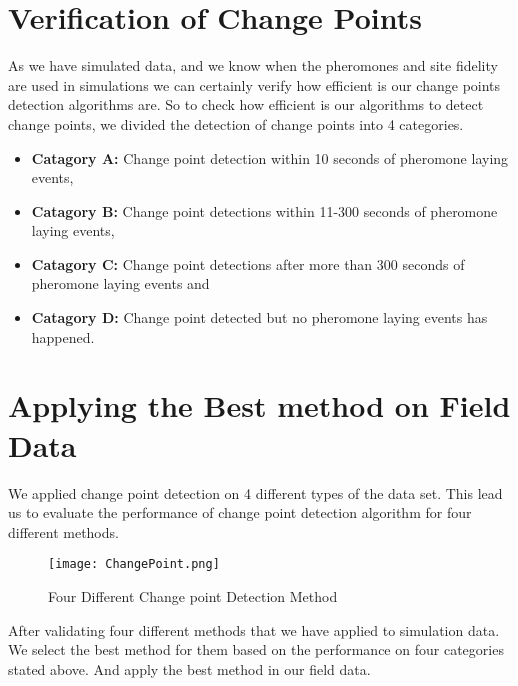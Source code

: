 \section{\label{section:Verification of Change Points}Verification of Change Points}
As we have simulated data, and we know when the pheromones and site fidelity are used in simulations we can certainly verify how efficient is our change points detection algorithms are. So to check how efficient is our algorithms to detect change points, we divided the detection of change points into 4 categories.
\begin{itemize}
	\item \textbf{Catagory A:} Change point detection within 10 seconds of pheromone laying events, 
	\item \textbf{Catagory B:} Change point detections within 11-300 seconds of pheromone laying events, 
	\item \textbf{Catagory C:} Change point detections after more than 300 seconds of pheromone laying events and 
	\item \textbf{Catagory D:} Change point detected but no pheromone laying events has happened. 
\end{itemize} 
\section{\label{section:Applying the Best method on Field Data}Applying the Best method on Field Data}
We applied change point detection on 4 different types of the data set. This lead us to evaluate the performance of change point detection algorithm for four different methods.
\begin{figure}[h]
	\texttt{[image: ChangePoint.png]}
	\caption{Four Different Change point Detection Method}
\end{figure}
After validating four different methods that we have applied to simulation data. We select the best method for them based on the performance on four categories stated above. And apply the best method in our field data.   

